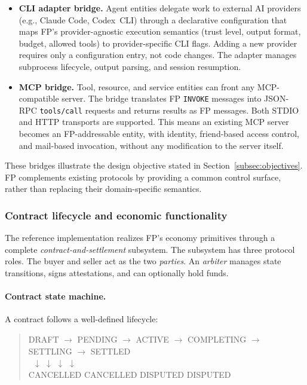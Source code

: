 \documentclass{llmxive}
\begin{document}
\begin{itemize}
    \item \textbf{CLI adapter bridge.}  Agent entities delegate work to
      external AI providers (e.g., Claude Code, Codex~CLI) through a
      declarative configuration that maps FP's provider-agnostic
      execution semantics (trust level, output format, budget, allowed
      tools) to provider-specific CLI flags.  Adding a new provider
      requires only a configuration entry, not code changes.  The adapter
      manages subprocess lifecycle, output parsing, and session
      resumption.

    \item \textbf{MCP bridge.}  Tool, resource, and service entities can
      front any MCP-compatible server.  The bridge translates FP
      \texttt{INVOKE} messages into JSON-RPC \texttt{tools/call} requests
      and returns results as FP messages.  Both STDIO and HTTP transports
      are supported.  This means an existing MCP server becomes an
      FP-addressable entity, with identity, friend-based access control,
      and mail-based invocation, without any modification to the server
      itself.
\end{itemize}

\noindent These bridges illustrate the design objective stated in
Section~\ref{subsec:objectives}. FP complements existing protocols by
providing a common control surface, rather than replacing their
domain-specific semantics.

\subsubsection{Contract lifecycle and economic functionality}

The reference implementation realizes FP's economy primitives through a complete \emph{contract-and-settlement} subsystem. The subsystem has three protocol roles. The buyer and seller act as the two \emph{parties}. An \emph{arbiter} manages state transitions, signs attestations, and can optionally hold funds.

\paragraph{Contract state machine.}
A contract follows a well-defined lifecycle:

\begin{quote}
\small\ttfamily
DRAFT $\rightarrow$ PENDING $\rightarrow$ ACTIVE $\rightarrow$ COMPLETING $\rightarrow$ SETTLING $\rightarrow$ SETTLED \\
\quad\, $\downarrow$ \hspace{4.2em} $\downarrow$ \hspace{3.8em} $\downarrow$ \hspace{5.6em} $\downarrow$ \\
\quad CANCELLED \hspace{1em} CANCELLED \hspace{0.8em} DISPUTED \hspace{2em} DISPUTED
\end{quote}
\end{document}
